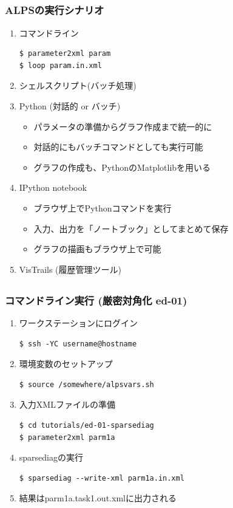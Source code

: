 \subsection*{\redm\whiteb\greenb}
\begin{frame}[t,fragile]
  \frametitle{ALPSの実行シナリオ}
  \begin{enumerate}
  \item コマンドライン
\begin{lstlisting}
$ parameter2xml param
$ loop param.in.xml
\end{lstlisting}
  \item シェルスクリプト(バッチ処理)
  \item Python (対話的 or バッチ)
    \begin{itemize}
    \item パラメータの準備からグラフ作成まで統一的に
    \item 対話的にもバッチコマンドとしても実行可能
    \item グラフの作成も、PythonのMatplotlibを用いる
    \end{itemize}
  \item IPython notebook
    \begin{itemize}
    \item ブラウザ上でPythonコマンドを実行
    \item 入力、出力を「ノートブック」としてまとめて保存
    \item グラフの描画もブラウザ上で可能
    \end{itemize}
  \item VisTrails (履歴管理ツール)
  \end{enumerate}
\end{frame}

\subsection*{\redm\whitem\greenb}
\begin{frame}[t,fragile]
  \frametitle{コマンドライン実行 (厳密対角化 ed-01)}
  \begin{enumerate}
  \item ワークステーションにログイン
\begin{lstlisting}
$ ssh -YC username@hostname
\end{lstlisting}
  \item 環境変数のセットアップ
\begin{lstlisting}
$ source /somewhere/alpsvars.sh
\end{lstlisting}
  \item 入力XMLファイルの準備
\begin{lstlisting}
$ cd tutorials/ed-01-sparsediag
$ parameter2xml parm1a
\end{lstlisting}
  \item sparsediagの実行
\begin{lstlisting}
$ sparsediag --write-xml parm1a.in.xml
\end{lstlisting}
  \item 結果はparm1a.task1.out.xmlに出力される
  \end{enumerate}
\end{frame}

